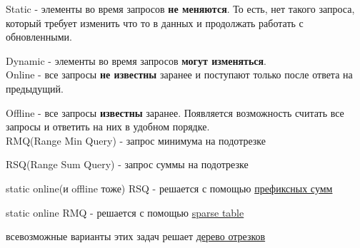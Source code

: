 \Def Static - элементы во время запросов \textbf{не меняются}. То есть, нет такого запроса, который требует изменить что то в данных и продолжать работать с обновленными.

\Def Dynamic - элементы во время запросов \textbf{могут изменяться}.\\

\Def Online - все запросы \textbf{не известны} заранее и поступают только после ответа на предыдущий.

\Def Offline - все запросы \textbf{известны} заранее. Появляется возможность считать все запросы и ответить на них в удобном порядке.\\

\Def RMQ(Range Min Query) - запрос минимума на подотрезке

\Def RSQ(Range Sum Query) - запрос суммы на подотрезке

\Examples

static online(и offline тоже) RSQ - решается с помощью \hyperlink{prefsum}{префиксных сумм}

static online RMQ - решается с помощью \hyperlink{sparse table}{sparse table}

всевозможные варианты этих задач решает \hyperlink{segtree}{дерево отрезков}
\pagebreak